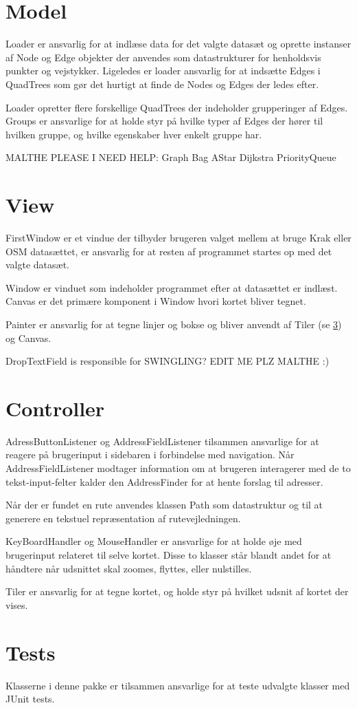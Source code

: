 \section{Model}
\label{sec:model}

Loader er ansvarlig for at indlæse data for det valgte datasæt og oprette instanser af Node og Edge objekter der anvendes som datastrukturer for henholdsvis punkter og vejstykker. Ligeledes er loader ansvarlig for at indsætte Edges i QuadTrees som gør det hurtigt at finde de Nodes og Edges der ledes efter.

Loader opretter flere forskellige QuadTrees der indeholder grupperinger af Edges. Groups er ansvarlige for at holde styr på hvilke typer af Edges der hører til hvilken gruppe, og hvilke egenskaber hver enkelt gruppe har.

MALTHE PLEASE I NEED HELP:
Graph
Bag
AStar
Dijkstra
PriorityQueue

\section{View}
\label{sec:view}

FirstWindow er et vindue der tilbyder brugeren valget mellem at bruge Krak eller OSM datasættet, er ansvarlig for at resten af programmet startes op med det valgte datasæt.

Window er vinduet som indeholder programmet efter at datasættet er indlæst. Canvas er det primære komponent i Window hvori kortet bliver tegnet.

Painter er ansvarlig for at tegne linjer og bokse og bliver anvendt af Tiler (se \ref{sec:controller}) og Canvas.

DropTextField is responsible for SWINGLING? EDIT ME PLZ MALTHE :)

\section{Controller}
\label{sec:controller}

AdressButtonListener og AddressFieldListener tilsammen ansvarlige for at reagere på brugerinput i sidebaren i forbindelse med navigation. Når AddressFieldListener modtager information om at brugeren interagerer med de to tekst-input-felter kalder den AddressFinder for at hente forslag til adresser.

Når der er fundet en rute anvendes klassen Path som datastruktur og til at generere en tekstuel repræsentation af rutevejledningen.

KeyBoardHandler og MouseHandler er ansvarlige for at holde øje med brugerinput relateret til selve kortet. Disse to klasser står blandt andet for at håndtere når udsnittet skal zoomes, flyttes, eller nulstilles.

Tiler er ansvarlig for at tegne kortet, og holde styr på hvilket udsnit af kortet der vises.

\section{Tests}
\label{sec:tests}

Klasserne i denne pakke er tilsammen ansvarlige for at teste udvalgte klasser med JUnit tests.
